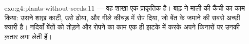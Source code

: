 \begin{solution}{exo:g4:plants-without-seeds:11}
 --- वह शाखा एक प्राकृतिक  है। बाढ़ ने माली की कैंची का
काम किया: उसने शाख़ काटी, उसे ढोया, और गीले कीचड़ में रोप दिया, जो बेंत
के  जमाने की सबसे अच्छी क्यारी है। नदियाँ बेंतों को तोड़ने और रोपने
का काम एक ही झटके में करके अपने किनारों पर उनकी क़तार लगा लेती हैं।
\end{solution}
